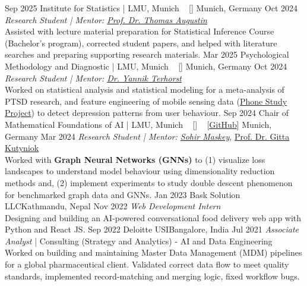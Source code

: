 \begin{experiences}
{    \vskip 0.1cm
    }
    \emptySeparator


   \researchexperience
    {Sep 2025}   {Institute for Statistics | LMU, Munich {\normalfont  ~ [\href{https://www.stat.lmu.de/en/}{\small{\websiteSymbol}}]
    }}{Munich, Germany}{}
    {Oct 2024} {\textit{Research Student | Mentor: \href{https://www.foundstat.statistik.uni-muenchen.de/personen/mitglieder/augustin/index.html}{Prof. Dr. Thomas Augustin}}\\
    Assisted with lecture material preparation for Statistical Inference Course (Bachelor's program), corrected student papers, and helped with literature searches and preparing supporting research materials.
    }
  \emptySeparator
    \researchexperience
    {Mar 2025}   {Psychological Methodology and Diagnostic | LMU, Munich {\normalfont  ~ [\href{https://www.lmu.de/psy/de/lehrstuehle/methoden/}{\small{\websiteSymbol}}]
    }}{Munich, Germany}{}
    {Oct 2024} {\textit{Research Student | Mentor: \href{https://www.lmu.de/psy/de/personen/kontaktseite/kontaktseite_12352.html}{Dr. Yannik Terhorst}}\\
    Worked on statistical analysis and statistical modeling for a meta-analysis of PTSD research, and feature engineering of mobile sensing data (\href{https://phonestudy.org/en/}{Phone Study Project}) to detect depression patterns from user behaviour.
    }
  \emptySeparator
  \researchexperience
  {Sep 2024} {Chair of Mathematical Foundations of AI | LMU, Munich {\normalfont  ~ [\href{https://www.lmu.de/psy/de/lehrstuehle/methoden/}{\small{\websiteSymbol}}]  ~ [\href{https://github.com/anjalisarawgi/visualizing_loss_landscapes}{GitHub}]
  }}{Munich, Germany}{}
   {Mar 2024}  {\textit{Research Student | Mentor: \href{https://www.sohirmaskey.com/}{Sohir Maskey}}, \href{https://www.ai.math.uni-muenchen.de/members/professor/kutyniok/index.html}{Prof. Dr. Gitta Kutyniok}\\
  Worked with \textbf{Graph Neural Networks (GNNs)} to (1) visualize loss landscapes to understand model behaviour using dimensionality reduction methods and, (2) implement experiments to study double descent phenomenon for benchmarked graph data and GNNs.
  }
  \emptySeparator
  \researchexperience
 {Jan 2023}  {Bask Solution LLC}{Kathmandu, Nepal}{}
 {Nov 2022}  {\textit{Web Development Intern} \\
  Designing and building an AI-powered conversational food delivery web app with Python and React JS.
  }
  \emptySeparator
  \researchexperience
  {Sep 2022}  {Deloitte USI}{Bangalore, India}{}
  {Jul 2021} {\textit{Associate Analyst} | Consulting (Strategy and Analytics) - AI and Data Engineering \\
  Worked on building and maintaining Master Data Management (MDM) pipelines for a global pharmaceutical client. Validated correct data flow to meet quality standards, implemented record-matching and merging logic, fixed workflow bugs.
  }
\end{experiences}
\vspace{-3mm}

